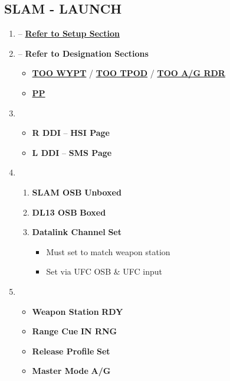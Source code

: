 \documentclass[fontInter]{TechCheck}
\begin{document}
	\subsection{SLAM - LAUNCH}
	\begin{enumerate}[leftmargin=0.1\textwidth, rightmargin=0.1\textwidth, itemsep=4pt, label=\textbf{\arabic*.}]
		\item {} -- \hyperref[subsec:slamsetup]{\textbf{Refer to Setup Section}}
		\item {} -- \textbf{Refer to Designation Sections}
		\begin{itemize}
			\item \hyperref[subsec:slamdestoowypt]{\textbf{TOO WYPT}}
			/ \hyperref[subsec:slamdestootpod]{\textbf{TOO TPOD}}
			/ \hyperref[subsec:slamdestooag]{\textbf{TOO A/G RDR}}
			\item \hyperref[subsec:slamdespp]{\textbf{PP}}
		\end{itemize}
		\item {}
		\begin{itemize}
			\item \textbf{R DDI} -- \textbf{HSI Page}
			\item \textbf{L DDI} -- \textbf{SMS Page}
		\end{itemize}
		\item {}
		\begin{enumerate}[itemsep=4pt]
			\item \textbf{SLAM OSB} \dotfill \textbf{Unboxed}
			\item \textbf{DL13 OSB} \dotfill \textbf{Boxed}
			\item \textbf{Datalink Channel} \dotfill \textbf{Set}
			\begin{itemize}
				\item Must set to match weapon station
				\item Set via UFC OSB \& UFC input
			\end{itemize}
		\end{enumerate}
		\item {}
		\begin{itemize}
			\item \textbf{Weapon Station} \dotfill \textbf{RDY}
			\item \textbf{Range Cue} \dotfill \textbf{IN RNG} 
			\item \textbf{Release Profile} \dotfill \textbf{Set}
			\item \textbf{Master Mode} \dotfill \textbf{A/G}

\end{itemize}
\end{enumerate}
\end{document}
